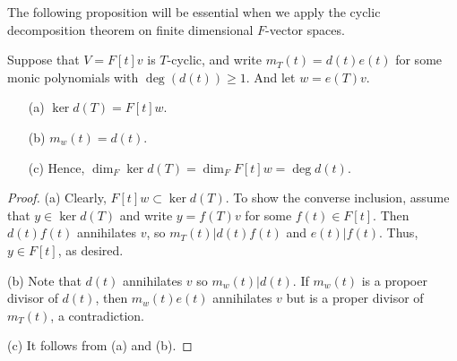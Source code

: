 The following proposition will be essential when we apply the cyclic decomposition theorem on finite dimensional $F$-vector spaces.
\begin{prop}
    Suppose that $V=F[t]v$ is $T$-cyclic, and write $m_T(t)=d(t)e(t)$ for some monic polynomials with $\deg(d(t))\geq 1$.
    And let $w=e(T)v$.
    \begin{enumerate}
        \item[(a)]
        {
            $\ker d(T)=F[t]w$.
        }
        \item[(b)]
        {
            $m_w(t)=d(t)$.
        }
        \item[(c)]
        {
            Hence, $\dim_F\ker d(T)=\dim_F F[t]w=\deg d(t)$.
        }
    \end{enumerate}
\end{prop}
\begin{proof}
    \hangindent=0.65cm
    \noindent(a)
    Clearly, $F[t]w\subset \ker d(T)$.
    To show the converse inclusion, assume that $y\in\ker d(T)$ and write $y=f(T)v$ for some $f(t)\in F[t]$.
    Then $d(t)f(t)$ annihilates $v$, so $m_T(t)|d(t)f(t)$ and $e(t)|f(t)$.
    Thus, $y\in F[t]$, as desired.

    \noindent(b)
    Note that $d(t)$ annihilates $v$ so $m_w(t)|d(t)$.
    If $m_w(t)$ is a propoer divisor of $d(t)$, then $m_w(t)e(t)$ annihilates $v$ but is a proper divisor of $m_T(t)$, a contradiction.

    \noindent(c)
    It follows from (a) and (b).
\end{proof}